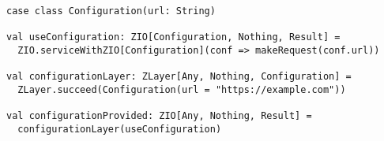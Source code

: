 \begin{algorithm}

\begin{verbatim}
case class Configuration(url: String)

val useConfiguration: ZIO[Configuration, Nothing, Result] =
  ZIO.serviceWithZIO[Configuration](conf => makeRequest(conf.url))

val configurationLayer: ZLayer[Any, Nothing, Configuration] =
  ZLayer.succeed(Configuration(url = "https://example.com"))

val configurationProvided: ZIO[Any, Nothing, Result] =
  configurationLayer(useConfiguration)
\end{verbatim}

\caption{Static data can be provided to computations with the ZIO environment.%
\label{zio:environment-simple}}
\end{algorithm}